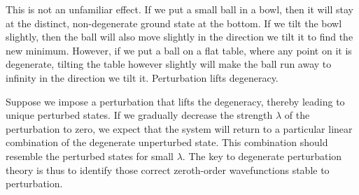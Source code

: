 \documentclass{article}
\theoremstyle{plain}\theoremheaderfont{\normalfont\itshape}\theorembodyfont{\rmfamily}\theoremseparator{.}\newtheorem*{rem}{Remark}\newtheorem*{ex}{Example}\newtheorem*{proof}{Proof}\newtheorem*{altp}{Alternative proof}
\theoremstyle{plain}\theoremheaderfont{\normalfont\bfseries}\theorembodyfont{\rmfamily}\theoremseparator{.}\newtheorem{thm}{Theorem}[section]\newtheorem{lem}[thm]{Lemma}\newtheorem{prop}[thm]{Proposition}\newtheorem*{cor}{Corollary}\newtheorem{defn}[thm]{Definition}\newtheorem{clm}[thm]{Claim}\newtheorem{clminproof}{Claim}
\theoremstyle{break}\theoremheaderfont{\normalfont\itshape}\theorembodyfont{\rmfamily}\theoremseparator{.\medskip}\newtheorem*{proofskip}{Proof}\newtheorem*{exs}{Examples}\newtheorem*{rems}{Remarks}
\theoremstyle{break}\theoremheaderfont{\normalfont\bfseries}\theorembodyfont{\rmfamily}\theoremseparator{.\medskip}\newtheorem{lemskip}[thm]{Lemma}\newtheorem{defnskip}[thm]{Definition}\newtheorem{propskip}[thm]{Proposition}\newtheorem{thmskip}[thm]{Theorem}
\numberwithin{equation}{section}
\begin{document}
    This is not an unfamiliar effect. If we put a small ball in a bowl, then it will stay at the distinct, non-degenerate ground state at the bottom. If we tilt the bowl slightly, then the ball will also move slightly in the direction we tilt it to find the new minimum. However, if we put a ball on a flat table, where any point on it is degenerate, tilting the table however slightly will make the ball run away to infinity in the direction we tilt it. Perturbation lifts degeneracy.

    Suppose we impose a perturbation that lifts the degeneracy, thereby leading to unique perturbed states. If we gradually decrease the strength \(\lambda\) of the perturbation to zero, we expect that the system will return to a particular linear combination of the degenerate unperturbed state. This combination should resemble the perturbed states for small \(\lambda\). The key to degenerate perturbation theory is thus to identify those correct zeroth-order wavefunctions stable to perturbation.
\end{document}
